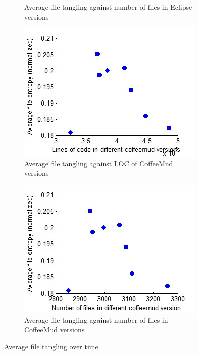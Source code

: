\documentclass[12pt]{article}
\begin{document}
\begin{figure}
\begin{subfigure}[b]{0.5\textwidth}
                \caption{Average file tangling against number of files in Eclipse versions}
                \label{tangle2}
        \end{subfigure}
        \begin{subfigure}[b]{0.5\textwidth}
                \centering
                \includegraphics[width=\textwidth]{average-tangling-vs-loc-coffeemud.jpg}
                \caption{Average file tangling against LOC of CoffeeMud versions}
                \label{tangle3}
        \end{subfigure}%
        \begin{subfigure}[b]{0.5\textwidth}
                \centering
                \includegraphics[width=\textwidth]{average-tangling-vs-num-files-coffeemud.jpg}
                \caption{Average file tangling against number of files in CoffeeMud versions}
                \label{tangle4}
        \end{subfigure}
        \caption{Average file tangling over time}\label{fig:tangling}
\end{figure}
\end{document}

